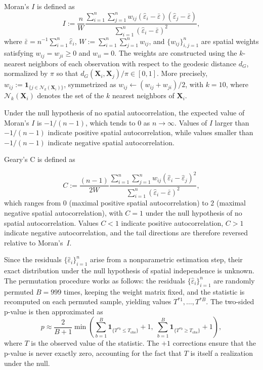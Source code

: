 \documentclass[12pt]{report} %
\newcommand{\bX}{\mathbf{X}}
\begin{document}
Moran's $I$ \citep[][see]{Moran1948} is defined as
\begin{equation}
\label{eq:moranI}
    I := \frac{n}{W}\frac{\sum_{i=1}^n \sum_{j=1}^n w_{ij}
    (\hat{\varepsilon}_i-\bar{\varepsilon})
    (\hat{\varepsilon}_j-\bar{\varepsilon})}
    {\sum_{i=1}^n (\hat{\varepsilon}_i-\bar{\varepsilon})^{2}},
\end{equation}
where $\bar{\varepsilon} = n^{-1}\sum_{i=1}^n \hat{\varepsilon}_i$,
$W := \sum_{i=1}^n \sum_{j=1}^n w_{ij}$, and $\{w_{ij} \}_{i,j=1}^n$ are spatial weights satisfying $w_{ij} = w_{ji} \geq 0$ and $w_{ii} = 0$. The weights are constructed using the $k$-nearest neighbors of each observation with respect to the geodesic distance $d_{G}$, normalized by $\pi$ so that $d_{G}(\bX_i, \bX_j)/\pi \in [0,1]$. More precisely, $w_{ij} := \mathbf{1}_{\{j \in \mathcal{N}_k(\bX_i)\}}$, symmetrized as $w_{ij} \leftarrow (w_{ij} + w_{ji})/2$, with $k = 10$, where $\mathcal{N}_k(\bX_i)$ denotes the set of the $k$ nearest neighbors of $\bX_i$.

Under the null hypothesis of no spatial autocorrelation, the expected value of Moran's $I$ is $-1/(n-1)$, which tends to $0$ as $n \to \infty$.
Values of $I$ larger than $-1/(n-1)$ indicate positive spatial autocorrelation, while values smaller than $-1/(n-1)$ indicate negative spatial autocorrelation. 

Geary's C \citep{Geary1954} is defined as

\begin{equation}
\label{eq:gearyC}
    C := \frac{(n-1)}{2W}\frac{\sum_{i=1}^n \sum_{j=1}^n w_{ij}
    (\hat{\varepsilon}_i-\hat{\varepsilon}_j)^2}
    {\sum_{i=1}^n (\hat{\varepsilon}_i-\bar{\varepsilon})^{2}},
\end{equation}
which ranges from $0$ (maximal positive spatial autocorrelation) to $2$
(maximal negative spatial autocorrelation), with $C = 1$ under the null hypothesis of no spatial autocorrelation. Values $C < 1$ indicate positive
autocorrelation, $C > 1$ indicate negative autocorrelation, and the tail directions are therefore reversed relative to Moran's~$I$.

Since the residuals $\{\hat{\varepsilon}_i\}_{i=1}^n$ arise from a nonparametric estimation step, their exact distribution under the null hypothesis of spatial independence is unknown.  The permutation procedure works as follows: the residuals $\{\hat{\varepsilon}_i\}_{i=1}^n$ are randomly permuted $B = 999$ times, keeping the weight matrix fixed, and the statistic is recomputed on each
permuted sample, yielding values $T^{*1}, \ldots, T^{*B}$. The two-sided p-value is then approximated as
\begin{equation}\label{eq:perm-pval}
    p \approx \frac{2}{B+1}\min\!\left(
        \sum_{b=1}^{B}\mathbf{1}_{\{T^{*b}\leq T_{\mathrm{obs}}\}}+1,\;
        \sum_{b=1}^{B}\mathbf{1}_{\{T^{*b}\geq T_{\mathrm{obs}}\}}+1
    \right),
\end{equation}
where $T$ is the observed value of the statistic. The $+1$ corrections ensure that the p-value is never exactly zero, accounting for the fact that $T$ is itself a realization under the null.
\end{document}
